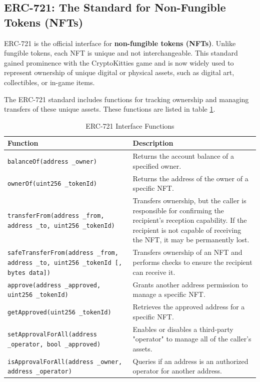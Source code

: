 \documentclass{scrbook}
\begin{document}
\subsection{ERC-721: The Standard for Non-Fungible Tokens (NFTs)}

ERC-721 is the official interface for \textbf{non-fungible tokens (NFTs)}. Unlike fungible tokens, each NFT is unique and not interchangeable. This standard gained prominence with the CryptoKitties game and is now widely used to represent ownership of unique digital or physical assets, such as digital art, collectibles, or in-game items.

The ERC-721 standard includes functions for tracking ownership and managing transfers of these unique assets. These functions are listed in table \ref{tbl:erc721_interface_functions}.

\begin{table}[h]
    \centering
    \begin{tabularx}{\linewidth}{|p{20em}|X|}
    \hline
    \textbf{Function} & \textbf{Description} \\
    \hline
    \texttt{balanceOf(address \_owner)} & Returns the account balance of a specified owner.\\
    \hline
    \texttt{ownerOf(uint256 \_tokenId)} & Returns the address of the owner of a specific NFT.\\
    \hline
    \texttt{transferFrom(address \_from, address \_to, uint256 \_tokenId)} & Transfers ownership, but the caller is responsible for confirming the recipient's reception capability. If the recipient is not capable of receiving the NFT, it may be permanently lost.\\
    \hline
    \texttt{safeTransferFrom(address \_from, address \_to, uint256 \_tokenId [, bytes data])} & Transfers ownership of an NFT and performs checks to ensure the recipient can receive it.\\
    \hline
    \texttt{approve(address \_approved, uint256 \_tokenId)} & Grants another address permission to manage a specific NFT.\\
    \hline
    \texttt{getApproved(uint256 \_tokenId)} & Retrieves the approved address for a specific NFT.\\
    \hline
    \texttt{setApprovalForAll(address \_operator, bool \_approved)} & Enables or disables a third-party "operator" to manage all of the caller's assets.\\
    \hline
    \texttt{isApprovalForAll(address \_owner, address \_operator)} & Queries if an address is an authorized operator for another address.\\
    \hline
    \end{tabularx}
    \caption{ERC-721 Interface Functions}
    \label{tbl:erc721_interface_functions}
\end{table}
\end{document}

